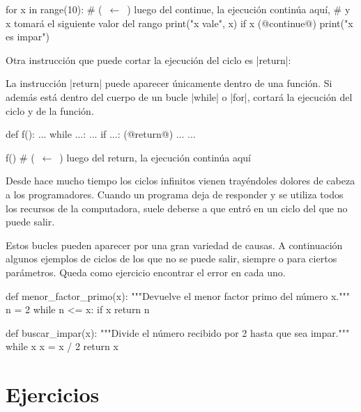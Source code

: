 \begin{codigo-python-sn}
for x in range(10): # (~$\leftarrow$~) luego del continue, la ejecución continúa aquí,
                    # y x tomará el siguiente valor del rango
    print("x vale", x)
    if x %
        (@continue@)
    print("x es impar")
\end{codigo-python-sn}

Otra instrucción que puede cortar la ejecución del ciclo es |return|:

\begin{observacion}
La instrucción |return| puede aparecer únicamente dentro de una función. Si
además está dentro del cuerpo de un bucle |while| o |for|, cortará la ejecución
del ciclo y de la función.

\begin{codigo-python-sn}
def f():
    ...
    while ...:
        ...
        if ...:
            (@return@)
        ...
    ...

f()
# (~$\leftarrow$~) luego del return, la ejecución continúa aquí
\end{codigo-python-sn}
\end{observacion}

\begin{sabias_que}
Desde hace mucho tiempo los ciclos infinitos vienen trayéndoles dolores de
cabeza a los programadores.  Cuando un programa deja de responder y se
utiliza todos los recursos de la computadora, suele deberse a que entró 
en un ciclo del que no puede salir.

Estos bucles pueden aparecer por una gran variedad de causas.  A
continuación algunos ejemplos de ciclos de los que no se puede salir,
siempre o para ciertos parámetros.  Queda como ejercicio encontrar el error
en cada uno.

\begin{codigo-python-sn}
def menor_factor_primo(x):
    """Devuelve el menor factor primo del número x."""
    n = 2
    while n <= x:
        if x %
            return n
\end{codigo-python-sn}

\begin{codigo-python-sn}
def buscar_impar(x):
    """Divide el número recibido por 2 hasta que sea impar."""
    while x %
        x = x / 2
    return x
\end{codigo-python-sn}
\end{sabias_que}

\section{Ejercicios}

